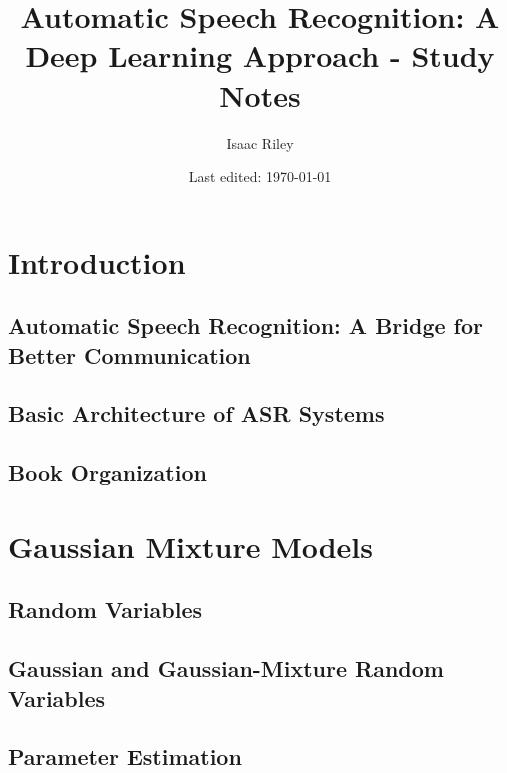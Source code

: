 \documentclass[a4paper]{article}
\title{Automatic Speech Recognition: A Deep Learning Approach - Study Notes}
\author{Isaac Riley}
\date{Last edited: \today}
\begin{document}
\maketitle
\tableofcontents
\newpage



\section{Introduction}
\subsection{Automatic Speech Recognition: A Bridge for Better Communication}

\subsection{Basic Architecture of ASR Systems}

\subsection{Book Organization}


\newpage
\section{Gaussian Mixture Models}
\subsection{Random Variables}

\subsection{Gaussian and Gaussian-Mixture Random Variables}

\subsection{Parameter Estimation}
\end{document}
